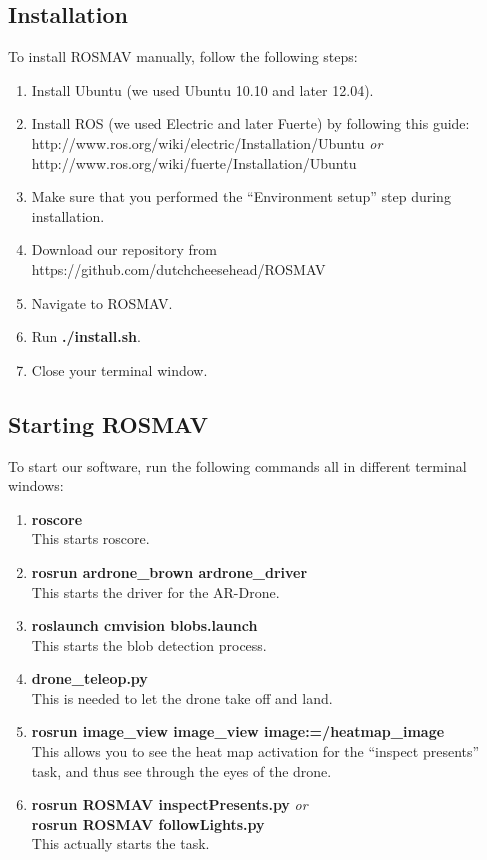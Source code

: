 \documentclass[a4paper,10pt]{article}
\begin{document}
\subsection{Installation}
To install ROSMAV manually, follow the following steps:
\begin{enumerate}
\item Install Ubuntu (we used Ubuntu 10.10 and later 12.04).

\item Install ROS (we used Electric and later Fuerte) by following this guide: \\
	  http://www.ros.org/wiki/electric/Installation/Ubuntu \textit{or}\\
	  http://www.ros.org/wiki/fuerte/Installation/Ubuntu

\item Make sure that you performed the ``Environment setup'' step during installation.

\item Download our repository from
      https://github.com/dutchcheesehead/ROSMAV

\item Navigate to ROSMAV.

\item Run \textbf{./install.sh}.
\item Close your terminal window.
\end{enumerate}

\subsection{Starting ROSMAV}
To start our software, run the following commands all in different terminal windows:
\begin{enumerate}
\item \textbf{roscore} \\ This starts roscore.
\item \textbf{rosrun ardrone\_brown ardrone\_driver} \\ This starts the driver for the AR-Drone.
\item \textbf{roslaunch cmvision blobs.launch} \\ This starts the blob detection process.
\item \textbf{drone\_teleop.py} \\ This is needed to let the drone take off and land.
\item \textbf{rosrun image\_view image\_view image:=/heatmap\_image} \\ This
      allows you to see the heat map activation for the ``inspect presents''
      task, and thus see through the eyes of the drone.
\item \textbf{rosrun ROSMAV inspectPresents.py} \textit{or} \\
      \textbf{rosrun ROSMAV followLights.py} \\
      This actually starts the task. 
\end{enumerate}
\end{document}

